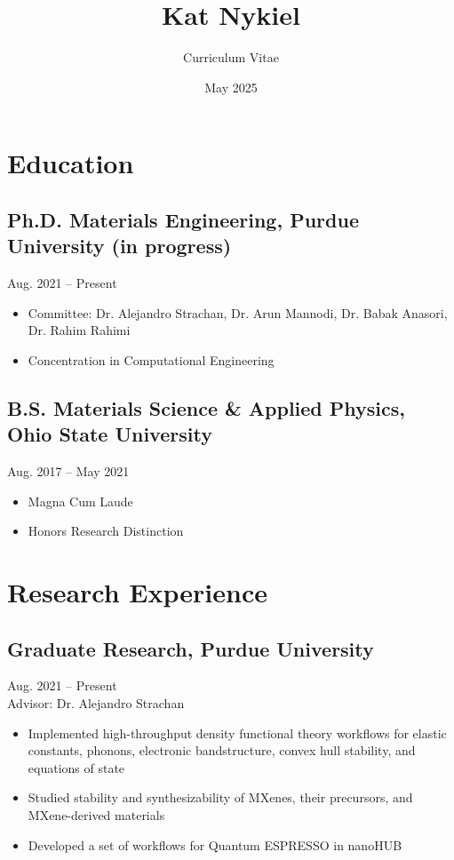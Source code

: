 \documentclass[11pt]{article}
\title{Kat Nykiel}
\author{Curriculum Vitae}
\date{May 2025}
\begin{document}
\maketitle

\section*{Education}

\subsection*{Ph.D. Materials Engineering, Purdue University (in progress)}
Aug. 2021 -- Present
\begin{itemize}[leftmargin=1.5em]
    \item Committee: Dr. Alejandro Strachan, Dr. Arun Mannodi, Dr. Babak Anasori, Dr. Rahim Rahimi
    \item Concentration in Computational Engineering
\end{itemize}

\subsection*{B.S. Materials Science \& Applied Physics, Ohio State University}
Aug. 2017 -- May 2021
\begin{itemize}[leftmargin=1.5em]
    \item Magna Cum Laude
    \item Honors Research Distinction
\end{itemize}

\section*{Research Experience}

\subsection*{Graduate Research, Purdue University}
Aug. 2021 -- Present \\
Advisor: Dr. Alejandro Strachan
\begin{itemize}[leftmargin=1.5em]
    \item Implemented high-throughput density functional theory workflows for elastic constants, phonons, electronic bandstructure, convex hull stability, and equations of state
    \item Studied stability and synthesizability of MXenes, their precursors, and MXene-derived materials
    \item Developed a set of workflows for Quantum ESPRESSO in nanoHUB
\end{itemize}
\end{document}
